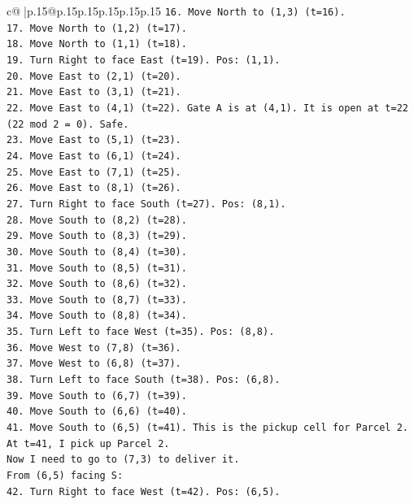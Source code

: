 \documentclass{article}
\begin{document}
{\begin{supertabular}{c@{$\;$}|p{.15\linewidth}@{}p{.15\linewidth}p{.15\linewidth}p{.15\linewidth}p{.15\linewidth}p{.15\linewidth}}
{{{\texttt{16. Move North to (1,3) (t=16).} \\
\texttt{17. Move North to (1,2) (t=17).} \\
\texttt{18. Move North to (1,1) (t=18).} \\
\texttt{19. Turn Right to face East (t=19). Pos: (1,1).} \\
\texttt{20. Move East to (2,1) (t=20).} \\
\texttt{21. Move East to (3,1) (t=21).} \\
\texttt{22. Move East to (4,1) (t=22). Gate A is at (4,1). It is open at t=22 (22 mod 2 = 0). Safe.} \\
\texttt{23. Move East to (5,1) (t=23).} \\
\texttt{24. Move East to (6,1) (t=24).} \\
\texttt{25. Move East to (7,1) (t=25).} \\
\texttt{26. Move East to (8,1) (t=26).} \\
\texttt{27. Turn Right to face South (t=27). Pos: (8,1).} \\
\texttt{28. Move South to (8,2) (t=28).} \\
\texttt{29. Move South to (8,3) (t=29).} \\
\texttt{30. Move South to (8,4) (t=30).} \\
\texttt{31. Move South to (8,5) (t=31).} \\
\texttt{32. Move South to (8,6) (t=32).} \\
\texttt{33. Move South to (8,7) (t=33).} \\
\texttt{34. Move South to (8,8) (t=34).} \\
\texttt{35. Turn Left to face West (t=35). Pos: (8,8).} \\
\texttt{36. Move West to (7,8) (t=36).} \\
\texttt{37. Move West to (6,8) (t=37).} \\
\texttt{38. Turn Left to face South (t=38). Pos: (6,8).} \\
\texttt{39. Move South to (6,7) (t=39).} \\
\texttt{40. Move South to (6,6) (t=40).} \\
\texttt{41. Move South to (6,5) (t=41). This is the pickup cell for Parcel 2.} \\
\texttt{At t=41, I pick up Parcel 2.} \\
\texttt{Now I need to go to (7,3) to deliver it.} \\
\texttt{From (6,5) facing S:} \\
\texttt{42. Turn Right to face West (t=42). Pos: (6,5).} \\
}}}
\end{supertabular}}
\end{document}
